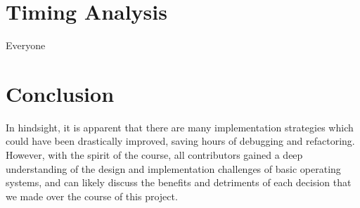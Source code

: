 \documentclass[11pt, oneside]{article}
\begin{document}
\section{Timing Analysis}
Everyone

\section{Conclusion}
In hindsight, it is apparent that there are many implementation strategies which could have been drastically improved, saving hours of debugging and refactoring. However, with the spirit of the course, all contributors gained a deep understanding of the design and implementation challenges of basic operating systems, and can likely discuss the benefits and detriments of each decision that we made over the course of this project.
\end{document}
